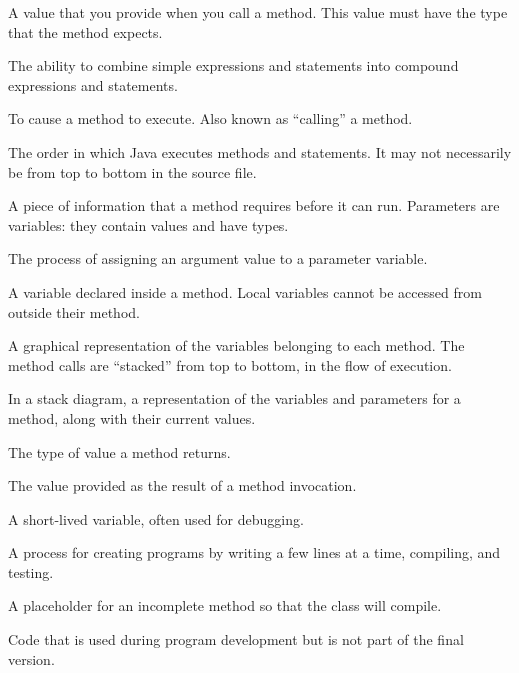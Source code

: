 \begin{description}



A value that you provide when you call a method.
This value must have the type that the method expects.

The ability to combine simple expressions and statements into compound expressions and statements.

To cause a method to execute.
Also known as ``calling'' a method.

The order in which Java executes methods and statements.
It may not necessarily be from top to bottom in the source file.

A piece of information that a method requires before it can run.
Parameters are variables: they contain values and have types.

The process of assigning an argument value to a parameter variable.

A variable declared inside a method.
Local variables cannot be accessed from outside their method.

A graphical representation of the variables belonging to each method.
The method calls are ``stacked'' from top to bottom, in the flow of execution.

In a stack diagram, a representation of the variables and parameters for a method, along with their current values.


The type of value a method returns.

The value provided as the result of a method invocation.

A short-lived variable, often used for debugging.

A process for creating programs by writing a few lines at a time, compiling, and testing.

A placeholder for an incomplete method so that the class will compile.

Code that is used during program development but is not part of the final version.

\end{description}


